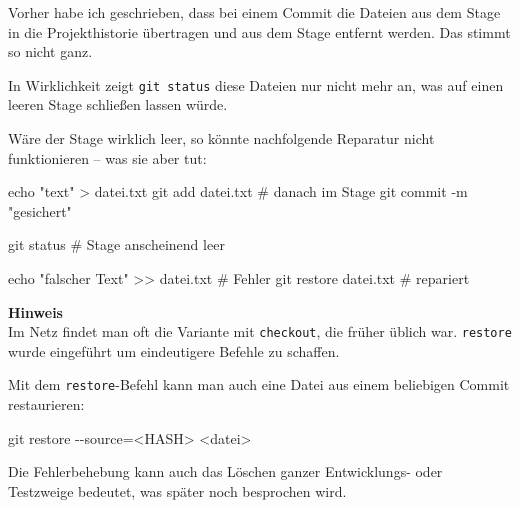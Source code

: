 \documentclass[
  letterpaper,
  DIV=11]{scrreprt}
\newenvironment{Shaded}{\begin{snugshade}}{\end{snugshade}}
\newcommand{\AttributeTok}[1]{\textcolor[rgb]{0.40,0.45,0.13}{#1}}
\newcommand{\BuiltInTok}[1]{\textcolor[rgb]{0.00,0.23,0.31}{#1}}
\newcommand{\CommentTok}[1]{\textcolor[rgb]{0.37,0.37,0.37}{#1}}
\newcommand{\FunctionTok}[1]{\textcolor[rgb]{0.28,0.35,0.67}{#1}}
\newcommand{\NormalTok}[1]{\textcolor[rgb]{0.00,0.23,0.31}{#1}}
\newcommand{\OperatorTok}[1]{\textcolor[rgb]{0.37,0.37,0.37}{#1}}
\newcommand{\StringTok}[1]{\textcolor[rgb]{0.13,0.47,0.30}{#1}}
\begin{document}
\samplestart

Vorher habe ich geschrieben, dass bei einem Commit die Dateien aus dem
Stage in die Projekthistorie übertragen und aus dem Stage entfernt
werden. Das stimmt so nicht ganz.

In Wirklichkeit zeigt \texttt{git\ status} diese Dateien nur nicht mehr
an, was auf einen leeren Stage schließen lassen würde. \sampleend

Wäre der Stage wirklich leer, so könnte nachfolgende Reparatur nicht
funktionieren -- was sie aber tut:

\begin{Shaded}
\begin{Highlighting}[]
\BuiltInTok{echo} \StringTok{"text"} \OperatorTok{\textgreater{}}\NormalTok{ datei.txt }
\FunctionTok{git}\NormalTok{ add datei.txt     }\CommentTok{\# danach im Stage }
\FunctionTok{git}\NormalTok{ commit }\AttributeTok{{-}m} \StringTok{"gesichert"}

\FunctionTok{git}\NormalTok{ status   }\CommentTok{\# Stage anscheinend leer }

\BuiltInTok{echo} \StringTok{"falscher Text"} \OperatorTok{\textgreater{}\textgreater{}}\NormalTok{ datei.txt   }\CommentTok{\#  Fehler }
\FunctionTok{git}\NormalTok{ restore datei.txt              }\CommentTok{\# repariert}
\end{Highlighting}
\end{Shaded}

\samplestart

\textbf{Hinweis}\\
Im Netz findet man oft die Variante mit \texttt{checkout}, die früher
üblich war. \texttt{restore} wurde eingeführt um eindeutigere Befehle zu
schaffen. \sampleend

Mit dem \texttt{restore}-Befehl kann man auch eine Datei aus einem
beliebigen Commit restaurieren:

\begin{Shaded}
\begin{Highlighting}[]
\FunctionTok{git}\NormalTok{ restore }\AttributeTok{{-}{-}source}\OperatorTok{=\textless{}}\NormalTok{HASH}\OperatorTok{\textgreater{}} \OperatorTok{\textless{}}\NormalTok{datei}\OperatorTok{\textgreater{}}
\end{Highlighting}
\end{Shaded}

Die Fehlerbehebung kann auch das Löschen ganzer Entwicklungs- oder
Testzweige bedeutet, was später noch besprochen wird.

\end{document}
